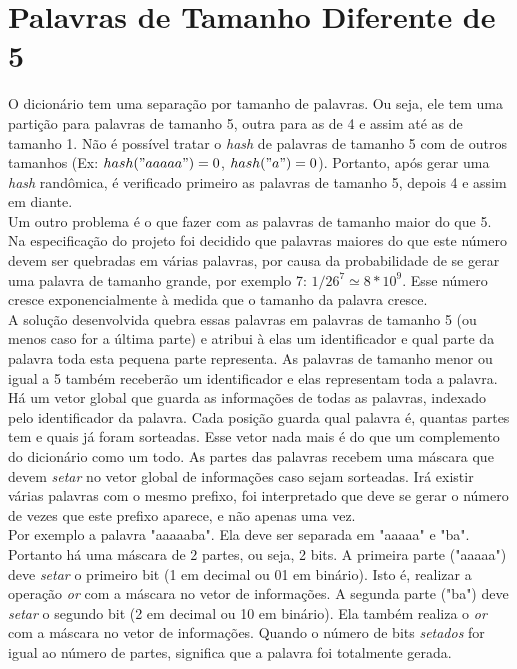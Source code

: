 \documentclass[a4paper]{article}
\begin{document}
\section{Palavras de Tamanho Diferente de 5}
\indent \indent O dicionário tem uma separação por tamanho de palavras. Ou seja, ele tem uma partição para palavras de tamanho 5, outra para as de 4 e assim até as de tamanho 1. Não é possível tratar o \emph{hash} de palavras de tamanho 5 com de outros tamanhos (Ex: \begin{math}hash("aaaaa") = 0\end{math}, \begin{math}hash("a") = 0\end{math}). Portanto, após gerar uma \emph{hash} randômica, é verificado primeiro as palavras de tamanho 5, depois 4 e assim em diante.\\
\indent Um outro problema é o que fazer com as palavras de tamanho maior do que 5. Na especificação do projeto foi decidido que palavras maiores do que este número devem ser quebradas em várias palavras, por causa da probabilidade de se gerar uma palavra de tamanho grande, por exemplo 7: \begin{math}1/26^7 \simeq 8*10^9\end{math}. Esse número cresce exponencialmente à medida que o tamanho da palavra cresce.\\
\indent A solução desenvolvida quebra essas palavras em palavras de tamanho 5 (ou menos caso for a última parte) e atribui à elas um identificador e qual parte da palavra toda esta pequena parte representa. As palavras de tamanho menor ou igual a 5 também receberão um identificador e elas representam toda a palavra. Há um vetor global que guarda as informações de todas as palavras, indexado pelo identificador da palavra. Cada posição guarda qual palavra é, quantas partes tem e quais já foram sorteadas. Esse vetor nada mais é do que um complemento do dicionário como um todo. As partes das palavras recebem uma máscara que devem \emph{setar} no vetor global de informações caso sejam sorteadas. Irá existir várias palavras com o mesmo prefixo, foi interpretado que deve se gerar o número de vezes que este prefixo aparece, e não apenas uma vez.\\
\indent Por exemplo a palavra "aaaaaba". Ela deve ser separada em "aaaaa" e "ba". Portanto há uma máscara de 2 partes, ou seja, 2 bits. A primeira parte ("aaaaa") deve \emph{setar} o primeiro bit (1 em decimal ou 01 em binário). Isto é, realizar a operação \emph{or} com a máscara no vetor de informações. A segunda parte ("ba") deve \emph{setar} o segundo bit (2 em decimal ou 10 em binário). Ela também realiza o \emph{or} com a máscara no vetor de informações. Quando o número de bits \emph{setados} for igual ao número de partes, significa que a palavra foi totalmente gerada.
\end{document}
